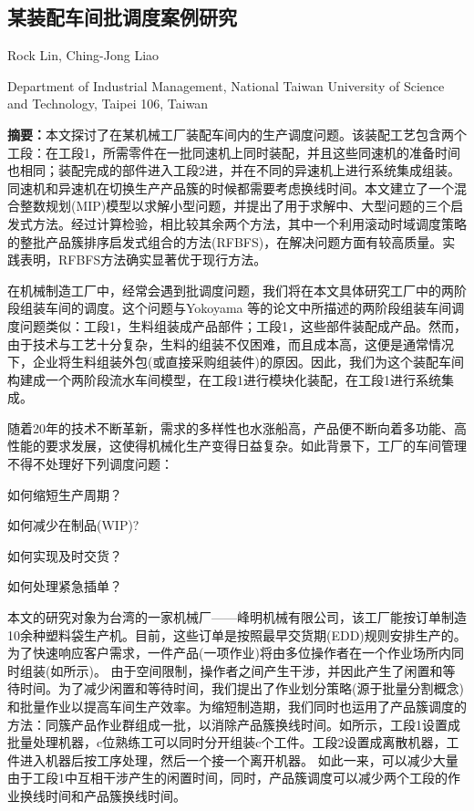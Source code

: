 \begin{Abstract}
\chapter*{某装配车间批调度案例研究}
\begin{center}
\vspace{2mm}
{
 {\xiaosi Rock Lin, Ching-Jong Liao}

 {\xiaowu Department of Industrial Management, National Taiwan University of Science and Technology, Taipei 106, Taiwan}
}
\end{center}
{\songti 
\noindent \xiaowu\textbf{摘要：}本文探讨了在某机械工厂装配车间内的生产调度问题。该装配工艺包含两个工段：在工段1，所需零件在一批同速机上同时装配，并且这些同速机的准备时间也相同；装配完成的部件进入工段2进，并在不同的异速机上进行系统集成组装。同速机和异速机在切换生产产品簇的时候都需要考虑换线时间。本文建立了一个混合整数规划(MIP)模型以求解小型问题，并提出了用于求解中、大型问题的三个启发式方法。经过计算检验，相比较其余两个方法，其中一个利用滚动时域调度策略的整批产品簇排序启发式组合的方法(RFBFS)，在解决问题方面有较高质量。实践表明，RFBFS方法确实显著优于现行方法。

}
\end{Abstract}


在机械制造工厂中，经常会遇到批调度问题，我们将在本文具体研究工厂中的两阶段组装车间的调度。这个问题与Yokoyama 等的论文中所描述的两阶段组装车间调度问题类似：工段1，生料组装成产品部件；工段1，这些部件装配成产品。然而，由于技术与工艺十分复杂，生料的组装不仅困难，而且成本高，这便是通常情况下，企业将生料组装外包(或直接采购组装件)的原因。因此，我们为这个装配车间构建成一个两阶段流水车间模型，在工段1进行模块化装配，在工段1进行系统集成。

随着20年的技术不断革新，需求的多样性也水涨船高，产品便不断向着多功能、高性能的要求发展，这使得机械化生产变得日益复杂。如此背景下，工厂的车间管理不得不处理好下列调度问题：
\begin{compactenum}[(1)]
\item 如何缩短生产周期？
\item 如何减少在制品(WIP)?
\item 如何实现及时交货？
\item 如何处理紧急插单？
\end{compactenum}

本文的研究对象为台湾的一家机械厂——峰明机械有限公司，该工厂能按订单制造10余种塑料袋生产机。目前，这些订单是按照最早交货期(EDD)规则安排生产的。为了快速响应客户需求，一件产品(一项作业)将由多位操作者在一个作业场所内同时组装(如所示)。
由于空间限制，操作者之间产生干涉，并因此产生了闲置和等待时间。为了减少闲置和等待时间，我们提出了作业划分策略(源于批量分割概念)和批量作业以提高车间生产效率。为缩短制造期，我们同时也运用了产品簇调度的方法：同簇产品作业群组成一批，以消除产品簇换线时间。如所示，工段1设置成批量处理机器，c位熟练工可以同时分开组装c个工件。工段2设置成离散机器，工件进入机器后按工序处理，然后一个接一个离开机器。
如此一来，可以减少大量由于工段1中互相干涉产生的闲置时间，同时，产品簇调度可以减少两个工段的作业换线时间和产品簇换线时间。


